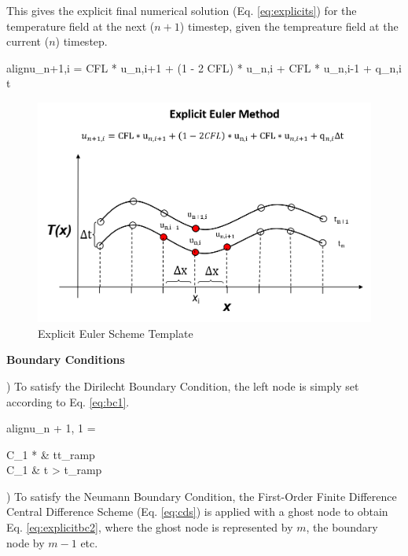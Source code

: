 \documentclass[10pt, letter, showtrims]{extarticle}
\newcommand{\boxedeq}[2]{\begin{empheq}[box={\fboxsep=6pt\fbox}]{align}\label{#1}#2\end{empheq}}
\begin{document}
		\vspace{1em}
		
		\noindent
		This gives the explicit final numerical solution (Eq. \ref{eq:explicits}) for the temperature field at the next ($n + 1$) timestep, given the tempreature field at the current ($n$) timestep.
		
		\boxedeq{eq:explicits}{u_{n+1,i} = CFL * u_{n,i+1} + (1 - 2 CFL) * u_{n,i} + CFL * u_{n,i-1} + q_{n,i} \Delta t}
		
%		
		
		\FloatBarrier
		\begin{figure}[h]
			\centering
			\captionsetup{justification=centering}
			\includegraphics[width=0.65\linewidth]{"Figures/Explicit_Euler_Method"}
			\caption{Explicit Euler Scheme Template}
			\label{fig:explicit}
		\end{figure}
		\FloatBarrier
		
		\pagebreak
		
		\noindent
		\textbf{Boundary Conditions}
		
		) To satisfy the Dirilecht Boundary Condition, the left node is simply set according to Eq. \ref{eq:bc1}.
		
		\boxedeq{eq:explicitbc1}{u_{n + 1, 1} = \begin{cases} 
          					C_{1} * \frac{t}{t_{ramp}} & t\leq t_{ramp} \\
          					C_{1}                      & t > t_{ramp}
       					\end{cases}}
		
		) To satisfy the Neumann Boundary Condition, the First-Order Finite Difference Central Difference Scheme (Eq. \ref{eq:cds}) is applied with a ghost node to obtain Eq. \ref{eq:explicitbc2}, where the ghost node is represented by $m$, the boundary node by $m - 1$ etc.
		
\end{document}
